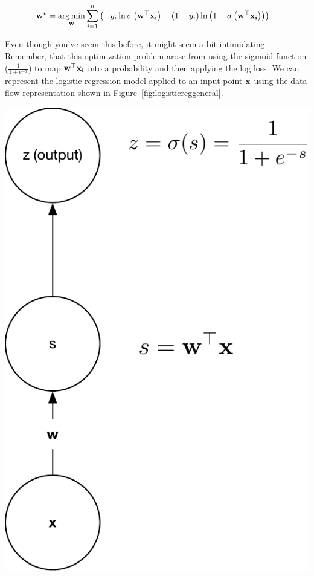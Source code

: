 \documentclass[assignment06_Solutions]{subfiles}
\begin{document}
\begin{align}
\mathbf{w^\star} &= \operatorname*{arg\,min}_{\mathbf{w}} \sum_{i=1}^n \left ( -y_i \ln \sigma\left (\mathbf{w}^\top \mathbf{x_i} \right) - (1-y_i) \ln \left ( 1 - \sigma\left (\mathbf{w}^\top \mathbf{x_i} \right) \right) \right)
\end{align}

Even though you've seem this before, it might seem a bit intimidating.  Remember, that this optimization problem arose from using the sigmoid function ($\frac{1}{1+e^{-x}}$) to map $\mathbf{w}^\top \mathbf{x_i}$ into a probability and then applying the log loss.  We can represent the logistic regression model applied to an input point $\mathbf{x}$ using the data flow representation shown in Figure~\ref{fig:logisticreggeneral}.
\begin{marginfigure}
\includegraphics[width=\linewidth]{figures/logisticregressiongeneral}\label{fig:logisticreggeneral}
\end{marginfigure}
\end{document}
